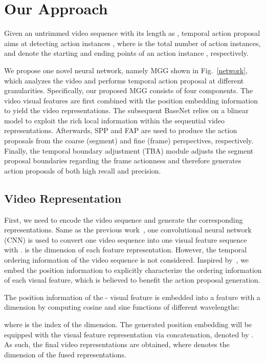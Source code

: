\documentclass[10pt,twocolumn,letterpaper]{article}
\begin{document}
\section{Our Approach}
\label{sec:approach}

Given an untrimmed video sequence  with its length as , temporal action proposal aims at detecting action instances , where 
 is the total number of action instances, and   denote the starting and ending points of an action instance , respectively.    

We propose one novel neural network, namely MGG shown in Fig.~\ref{network}, which analyzes the video and performs temporal action proposal at different granularities. Specifically, our proposed MGG consists of four components. The video visual features are first combined with the position embedding information to yield the video representations.  The subsequent BaseNet relies on a blinear model to exploit the rich local information within the sequential video representations. Afterwards, SPP and FAP are used to produce the action proposals from the coarse (segment) and fine (frame) perspectives, respectively. Finally, the temporal boundary adjustment (TBA) module adjusts the segment proposal boundaries regarding the frame actionness and therefore generates action proposals of both high recall and precision.


\subsection{Video Representation} 
First, we need to encode the video sequence and generate the corresponding representations. Same as the previous work~\cite{bsn,ctap}, one convolutional neural network (CNN) is used to convert one video sequence  into one visual feature sequence  with .  is the dimension of each feature representation. However, the temporal ordering information of the video sequence is not considered. Inspired by~\cite{attention_is,conv_seq2seq}, we embed the position information to explicitly characterize the ordering information of each visual feature, which is believed to benefit the action proposal generation. {The position information of the -  visual feature  is embedded into a feature  with a dimension  by computing cosine and sine functions of different wavelengths:

where  is the index of the dimension. The generated position embedding  will be equipped with the visual feature representation  via concatenation, denoted by . As such, the final video representations  are obtained, where  denotes the dimension of the fused representations.}
\end{document}
